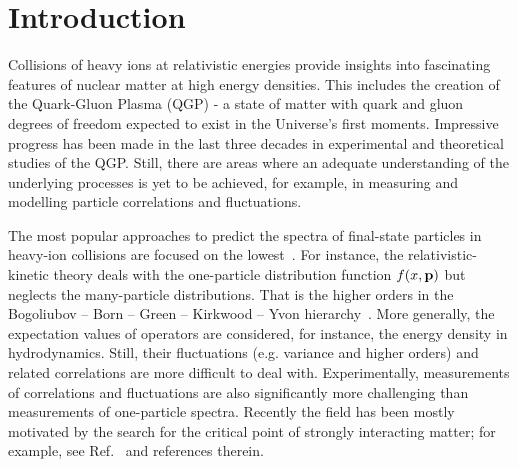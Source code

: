 \documentclass[floatfix,superscriptaddress,a4paper,
               showpieces,showkeys,nofootinbib,preprint]{revtex4-2}
\begin{document}
\maketitle

\newpage


\section{Introduction}

Collisions of heavy ions at relativistic energies provide insights into fascinating features of nuclear matter at high energy densities.
This includes the creation of the Quark-Gluon Plasma (QGP) - a state of matter with quark and gluon degrees of freedom expected to exist in the Universe's first moments. Impressive progress has been made in the last three decades in experimental and theoretical studies of the QGP. Still, there are areas where an adequate understanding of the underlying processes is yet to be achieved, for example, in measuring and modelling particle correlations and fluctuations.

The most popular approaches to predict the spectra of final-state particles in heavy-ion collisions are focused on the lowest~\cite{Florkowski:Phenomenology}. For instance,
the relativistic-kinetic theory deals with the one-particle distribution function $f(x,{\bf p})$ but neglects the many-particle distributions. That is the higher orders in the Bogoliubov – Born – Green – Kirkwood – Yvon hierarchy~\cite{Bogoliubov:1946}. 
More generally, the expectation values of operators are considered, for instance, the energy density in hydrodynamics. Still, their fluctuations (e.g. variance and higher orders) and related correlations are more difficult to deal with. Experimentally, measurements of correlations and fluctuations are also significantly more challenging than measurements of one-particle spectra.
Recently the field has been mostly motivated by the search for the critical point of strongly interacting matter; for example, see Ref.~\cite{Gazdzicki:2015ska} and references therein.
\end{document}
